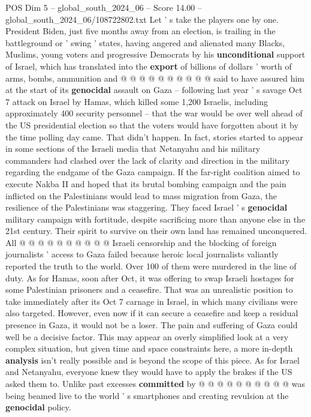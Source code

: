 \begin{textsample}{POS Dim 5 – global\_south\_2024\_06 – Score 14.00 – global\_south\_2024\_06/108722802.txt}
Let ' s take the players one by one.
President Biden, just five months away from an election, is trailing in the battleground or ' swing ' states, having angered and alienated many Blacks, Muslims, young voters and progressive Democrats by his \textbf{unconditional} support of Israel, which has translated into the \textbf{export} of billions of dollars ' worth of arms, bombs, ammunition and @ @ @ @ @ @ @ @ @ @ said to have assured him at the start of its \textbf{genocidal} assault on Gaza -- following last year ' s savage Oct 7 attack on Israel by Hamas, which killed some 1,200 Israelis, including approximately 400 security personnel -- that the war would be over well ahead of the US presidential election so that the voters would have forgotten about it by the time polling day came.
That didn't happen.
In fact, stories started to appear in some sections of the Israeli media that Netanyahu and his military commanders had clashed over the lack of clarity and direction in the military regarding the endgame of the Gaza campaign.
If the far-right coalition aimed to execute Nakba II and hoped that its brutal bombing campaign and the pain inflicted on the Palestinians would lead to mass migration from Gaza, the resilience of the Palestinians was staggering.
They faced Israel ' s \textbf{genocidal} military campaign with fortitude, despite sacrificing more than anyone else in the 21st century.
Their spirit to survive on their own land has remained unconquered.
All @ @ @ @ @ @ @ @ @ @ Israeli censorship and the blocking of foreign journalists ' access to Gaza failed because heroic local journalists valiantly reported the truth to the world.
Over 100 of them were murdered in the line of duty.
As for Hamas, soon after Oct, it was offering to swap Israeli hostages for some Palestinian prisoners and a ceasefire.
That was an unrealistic position to take immediately after its Oct 7 carnage in Israel, in which many civilians were also targeted.
However, even now if it can secure a ceasefire and keep a residual presence in Gaza, it would not be a loser.
The pain and suffering of Gaza could well be a decisive factor.
This may appear an overly simplified look at a very complex situation, but given time and space constraints here, a more in-depth \textbf{analysis} isn't really possible and is beyond the scope of this piece.
As for Israel and Netanyahu, everyone knew they would have to apply the brakes if the US asked them to.
Unlike past excesses \textbf{committed} by @ @ @ @ @ @ @ @ @ @ was being beamed live to the world ' s smartphones and creating revulsion at the \textbf{genocidal} policy.

\end{textsample}

